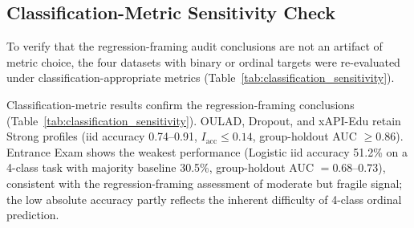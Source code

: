 \documentclass[10pt,letterpaper]{wlscirep}
\begin{document}
\subsection{Classification-Metric Sensitivity Check}

To verify that the regression-framing audit conclusions are not an artifact of metric choice, the four datasets with binary or ordinal targets were re-evaluated under classification-appropriate metrics (Table~\ref{tab:classification_sensitivity}).

Classification-metric results confirm the regression-framing conclusions (Table~\ref{tab:classification_sensitivity}). OULAD, Dropout, and xAPI-Edu retain Strong profiles (iid accuracy 0.74--0.91, $I_{\mathrm{acc}} \leq 0.14$, group-holdout AUC $\geq 0.86$). Entrance Exam shows the weakest performance (Logistic iid accuracy 51.2\% on a 4-class task with majority baseline 30.5\%, group-holdout AUC $= 0.68$--$0.73$), consistent with the regression-framing assessment of moderate but fragile signal; the low absolute accuracy partly reflects the inherent difficulty of 4-class ordinal prediction.
\end{document}
